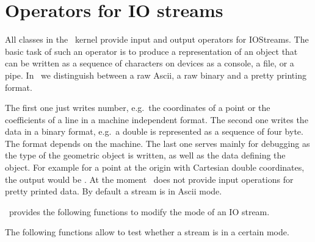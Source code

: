 
\cleardoublepage
\chapter{Operators for IO streams}\label{ChapterIO}

All classes in the \cgal\ kernel provide input and output operators for
IOStreams.  The basic task of such an operator is to produce a
representation of an object that can be written as a sequence of
characters on devices as a console, a file, or a pipe. In \cgal\ 
we distinguish between  a raw {\sc Ascii}, a raw binary and a 
pretty printing format. 



The first one just writes number, e.g.\ the coordinates of a point or
the coefficients of a line in a machine independent format. The second
one writes the data in a binary format, e.g.\ a double is represented
as a sequence of four byte. The format depends on the machine. The
last one serves mainly for debugging as the type of the geometric
object is written, as well as the data defining the object. For example
for a point at the origin with Cartesian double coordinates, the output
would be \ccc{CGAL_PointC2(0.0, 0.0)}.  At the moment \cgal\ does not
provide input operations for pretty printed data. By default a stream
is in {\sc Ascii} mode.


\cgal\ provides the following functions to modify the mode of an IO stream.


\ccGlue
{}
\ccGlue
{}

The following functions allow to test whether a stream is in a certain mode.


\ccGlue
{}
\ccGlue
{}


\newpage


